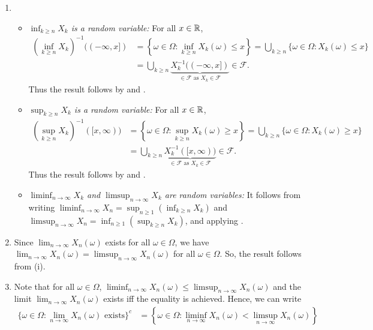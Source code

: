 \begin{enumerate}
\begin{enumerate}
\begin{pf}
\begin{enumerate}
\item 
\begin{itemize}
\item \emph{\(\inf_{k\ge n}X_k\) is a random variable:}
For all \(x\in\mathbb{R}\),
\begin{align*}
\left(\inf_{k\ge n}X_k\right)^{-1}((-\infty,x])
&=\left\{\omega\in\Omega:\inf_{k\ge n}X_k(\omega)\le x\right\}
=\bigcup_{k\ge n}^{}\{\omega\in\Omega:X_k(\omega)\le x\} \\
&=\bigcup_{k\ge n}^{}\underbrace{X_k^{-1}((-\infty,x])}_{\in\mathcal{F}\text{ as \(X_k\in\mathcal{F}\)}}
\in\mathcal{F}.
\end{align*}
Thus the result follows by  and
.
\item \emph{\(\sup_{k\ge n}X_k\) is a random variable:}
For all \(x\in\mathbb{R}\),
\begin{align*}
\left(\sup_{k\ge n}X_k\right)^{-1}([x,\infty))
&=\left\{\omega\in\Omega:\sup_{k\ge n}X_k(\omega)\ge x\right\}
=\bigcup_{k\ge n}^{}\{\omega\in\Omega:X_k(\omega)\ge x\} \\
&=\bigcup_{k\ge n}^{}\underbrace{X_k^{-1}([x,\infty))}_{\in\mathcal{F}\text{ as \(X_k\in\mathcal{F}\)}}
\in\mathcal{F}.
\end{align*}
Thus the result follows by  and
.
\item \emph{\(\liminf_{n\to\infty}X_k\) and \(\limsup_{n\to\infty}X_k\) are random variables:}
It follows from writing \(\liminf_{n\to \infty}X_n
=\sup_{n\ge 1}(\inf_{k\ge n}X_k)\) and \(\limsup_{n\to\infty}X_n=\inf_{n\ge 1}(\sup_{k\ge n}X_k)\),
and applying .
\end{itemize}
\item Since \(\lim_{n\to\infty}X_n(\omega)\) exists for all \(\omega\in\Omega\),
we have \(\lim_{n\to\infty}X_n(\omega)=\limsup_{n\to\infty}X_n(\omega)\)
for all \(\omega\in\Omega\). So, the result follows from (i).
\item Note that for all \(\omega\in\Omega\),
\(\liminf_{n\to\infty}X_n(\omega)\le\limsup_{n\to\infty}X_n(\omega)\)
and the limit \(\lim_{n\to\infty}X_n(\omega)\) exists iff the equality is
achieved. Hence, we can write
\begin{align}
\nonumber\{\omega\in\Omega:\lim_{n\to\infty}X_n(\omega)\text{ exists}\}^{c}
\label{eq:q-liminf-limsup}&=\left\{\omega\in\Omega:\liminf_{n\to\infty}X_n(\omega)<\limsup_{n\to\infty}X_n(\omega)\right\} \\

\end{align}
\end{enumerate}
\end{pf}
\end{enumerate}
\end{enumerate}
